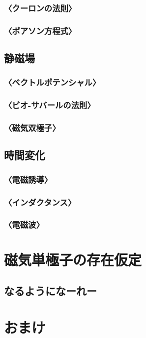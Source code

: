 \documentclass[10pt,b5paper,papersize,dvipdfmx]{jsbook}
\begin{document}
\subsubsection{〈クーロンの法則〉}
\subsubsection{〈ポアソン方程式〉}

\subsection{静磁場}
\subsubsection{〈ベクトルポテンシャル〉}
\subsubsection{〈ビオ-サバールの法則〉}
\subsubsection{〈磁気双極子〉}

\subsection{時間変化}
\subsubsection{〈電磁誘導〉}
\subsubsection{〈インダクタンス〉}
\subsubsection{〈電磁波〉}


\section{磁気単極子の存在仮定}
\subsection{なるようになーれー}

\section{おまけ}
\end{document}

